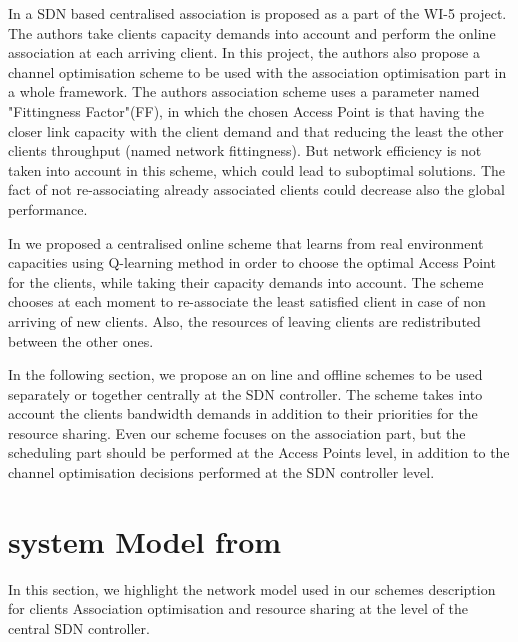 \documentclass[journal,transmag]{IEEEtran}
\begin{document}
In \cite{17QOS_AP_selection} a SDN based centralised association is proposed as a part of the WI-5 project. The authors take clients capacity demands into account and perform the online association at each arriving client. In this project, the authors also propose a channel optimisation scheme to be used with the association optimisation part in a whole framework. The authors association scheme uses a parameter named "Fittingness Factor"(FF), in which the chosen Access Point is that having the closer link capacity with the client demand and that reducing the least the other clients throughput (named network fittingness). But network efficiency is not taken into account in this scheme, which could lead to suboptimal solutions. The fact of not re-associating already associated clients could decrease also the global performance.     

In \cite{19reinforcement_learning} we proposed a centralised online scheme that learns from real environment capacities using Q-learning method in order to choose the optimal Access Point for the clients, while taking their capacity demands into account. The scheme chooses at each moment to re-associate the least satisfied client in case of non arriving of new clients. Also, the resources of leaving clients are redistributed between the other ones.    

In the following section, we propose an on line and offline schemes to be used separately or together centrally at the SDN controller. The scheme takes into account the clients bandwidth demands in addition to their priorities for the resource sharing. Even our scheme focuses on the association part, but the scheduling part should be performed at the Access Points level, in addition to the channel optimisation decisions performed at the SDN controller level. 

\section{system Model from}
\label{Proposed scheme model}
In this section, we highlight the network model used in our schemes description for clients Association optimisation and resource sharing at the level of the central SDN controller.
\end{document}
